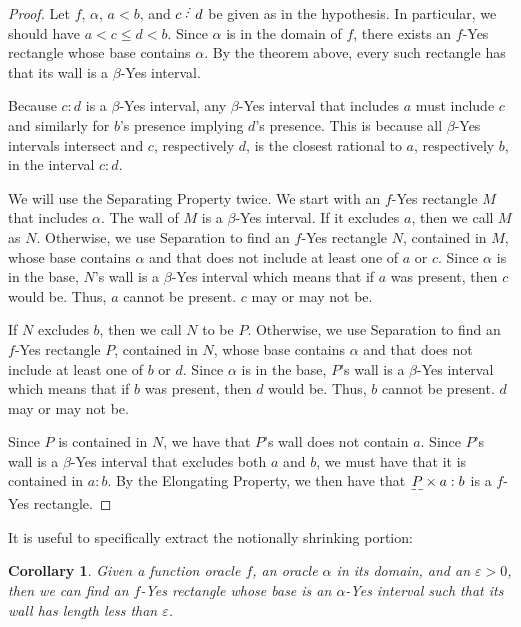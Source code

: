 \documentclass[12pt]{article}
\newtheorem{corollary}{Corollary}[subsection]
\begin{document}
\begin{proof}
    Let $f$, $\alpha$, $a<b$, and $c\lte d$ be given as in the hypothesis. In particular, we should have $a< c \leq d < b$. Since $\alpha$ is in the domain of $f$, there exists an $f$-Yes rectangle whose base contains $\alpha$. By the theorem above, every such rectangle has that its wall is a $\beta$-Yes interval. 

    Because $c:d$ is a $\beta$-Yes interval, any $\beta$-Yes interval that includes $a$ must include $c$ and similarly for $b$'s presence implying $d$'s presence. This is because all $\beta$-Yes intervals intersect and $c$, respectively $d$, is the closest rational to $a$, respectively $b$, in the interval $c:d$.

    We will use the Separating Property twice. We start with an $f$-Yes rectangle $M$ that includes $\alpha$. The wall of $M$ is a $\beta$-Yes interval. If it excludes $a$, then we call $M$ as $N$. Otherwise, we use Separation to find an $f$-Yes rectangle $N$, contained in $M$, whose base contains $\alpha$ and that does not include at least one of $a$ or $c$. Since $\alpha$ is in the base, $N$'s wall is a $\beta$-Yes interval which means that if $a$ was present, then $c$ would be. Thus, $a$ cannot be present. $c$ may or may not be. 

    If $N$ excludes $b$, then we call $N$ to be $P$. Otherwise, we use Separation to find an $f$-Yes rectangle $P$, contained in $N$, whose base contains $\alpha$ and that does not include at least one of $b$ or $d$. Since $\alpha$ is in the base, $P$'s wall is a $\beta$-Yes interval which means that if $b$ was present, then $d$ would be. Thus, $b$ cannot be present. $d$ may or may not be. 

    Since $P$ is contained in $N$, we have that $P$'s wall does not contain $a$. Since $P$'s wall is a $\beta$-Yes interval that excludes both $a$ and $b$, we must have that it is contained in $a:b$. By the Elongating Property, we then have that $\base{P} \times a:b$ is a $f$-Yes rectangle. 

\end{proof}


It is useful to specifically extract the notionally shrinking portion:

\begin{corollary}
Given a function oracle $f$, an oracle $\alpha$ in its domain, and an $\varepsilon > 0$, then we can find an $f$-Yes rectangle whose base is an $\alpha$-Yes interval such that its wall has length less than $\varepsilon$.
\end{corollary}
\end{document}
